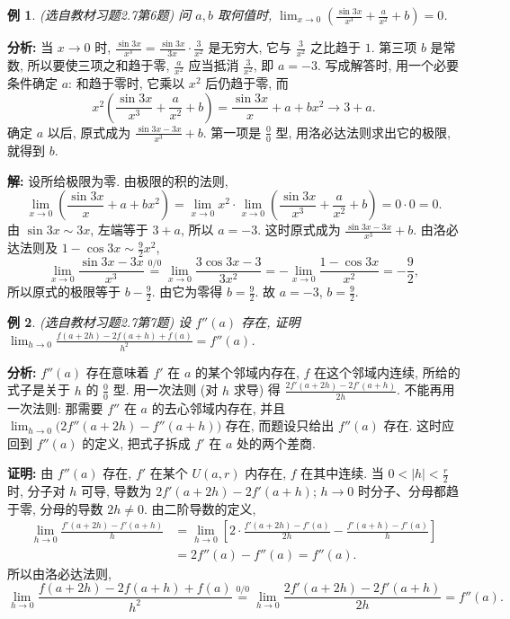 \documentclass[UTF8,openany]{ctexbook}
\theoremstyle{chinesetextbook}
\newtheorem{example}{例}[section]
\newenvironment{cnproof}{\par\indent\textbf{证明:} \ignorespaces}{\par}
\newenvironment{cnsolution}{\par\indent\textbf{解:} \ignorespaces}{\par}
\begin{document}
\begin{example}\label{ex:c2-h7-6}
\textnormal{(选自教材习题2.7第6题)} 问 $a,b$ 取何值时, $\displaystyle\lim_{x\to0}\left(\frac{\sin3x}{x^3}+\frac a{x^2}+b\right)=0$.
\end{example}
\par\indent\textbf{分析:} 当 $x\to0$ 时, $\displaystyle\frac{\sin3x}{x^3}=\frac{\sin3x}{3x}\cdot\frac3{x^2}$ 是无穷大, 它与 $\displaystyle\frac3{x^2}$ 之比趋于 $1$. 第三项 $b$ 是常数, 所以要使三项之和趋于零, $\displaystyle\frac a{x^2}$ 应当抵消 $\displaystyle\frac3{x^2}$, 即 $a=-3$. 写成解答时, 用一个必要条件确定 $a$: 和趋于零时, 它乘以 $x^2$ 后仍趋于零, 而
\[
x^2\left(\frac{\sin3x}{x^3}+\frac a{x^2}+b\right)=\frac{\sin3x}x+a+bx^2\to3+a.
\]
确定 $a$ 以后, 原式成为 $\displaystyle\frac{\sin3x-3x}{x^3}+b$. 第一项是 $\displaystyle\frac00$ 型, 用洛必达法则求出它的极限, 就得到 $b$.
\begin{cnsolution}
设所给极限为零. 由极限的积的法则,
\[
\lim_{x\to0}\left(\frac{\sin3x}x+a+bx^2\right)=\lim_{x\to0}x^2\cdot\lim_{x\to0}\left(\frac{\sin3x}{x^3}+\frac a{x^2}+b\right)=0\cdot0=0.
\]
由 $\sin3x\sim3x$, 左端等于 $3+a$, 所以 $a=-3$. 这时原式成为 $\displaystyle\frac{\sin3x-3x}{x^3}+b$. 由洛必达法则及 $\displaystyle1-\cos3x\sim\frac92x^2$,
\[
\lim_{x\to0}\frac{\sin3x-3x}{x^3}\overset{0/0}{=}\lim_{x\to0}\frac{3\cos3x-3}{3x^2}=-\lim_{x\to0}\frac{1-\cos3x}{x^2}=-\frac92,
\]
所以原式的极限等于 $\displaystyle b-\frac92$. 由它为零得 $\displaystyle b=\frac92$. 故 $a=-3$, $\displaystyle b=\frac92$.
\end{cnsolution}
\begin{example}\label{ex:c2-h7-7}
\textnormal{(选自教材习题2.7第7题)} 设 $f''(a)$ 存在, 证明 $\displaystyle\lim_{h\to0}\frac{f(a+2h)-2f(a+h)+f(a)}{h^2}=f''(a)$.
\end{example}
\par\indent\textbf{分析:} $f''(a)$ 存在意味着 $f'$ 在 $a$ 的某个邻域内存在, $f$ 在这个邻域内连续, 所给的式子是关于 $h$ 的 $\displaystyle\frac00$ 型. 用一次法则 (对 $h$ 求导) 得 $\displaystyle\frac{2f'(a+2h)-2f'(a+h)}{2h}$. 不能再用一次法则: 那需要 $f''$ 在 $a$ 的去心邻域内存在, 并且 $\displaystyle\lim_{h\to0}\bigl(2f''(a+2h)-f''(a+h)\bigr)$ 存在, 而题设只给出 $f''(a)$ 存在. 这时应回到 $f''(a)$ 的定义, 把式子拆成 $f'$ 在 $a$ 处的两个差商.
\begin{cnproof}
由 $f''(a)$ 存在, $f'$ 在某个 $U(a,r)$ 内存在, $f$ 在其中连续. 当 $\displaystyle0<|h|<\frac r2$ 时, 分子对 $h$ 可导, 导数为 $2f'(a+2h)-2f'(a+h)$; $h\to0$ 时分子、分母都趋于零, 分母的导数 $2h\ne0$. 由二阶导数的定义,
\[
\begin{aligned}
\lim_{h\to0}\frac{f'(a+2h)-f'(a+h)}h&=\lim_{h\to0}\left[2\cdot\frac{f'(a+2h)-f'(a)}{2h}-\frac{f'(a+h)-f'(a)}h\right]\\
&=2f''(a)-f''(a)=f''(a).
\end{aligned}
\]
所以由洛必达法则,
\[
\lim_{h\to0}\frac{f(a+2h)-2f(a+h)+f(a)}{h^2}\overset{0/0}{=}\lim_{h\to0}\frac{2f'(a+2h)-2f'(a+h)}{2h}=f''(a).
\]
\end{cnproof}
\end{document}
